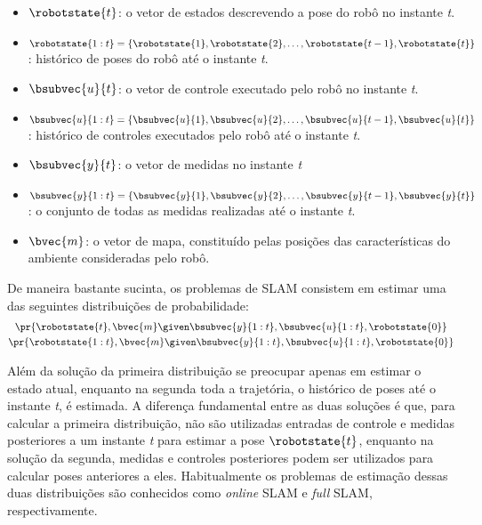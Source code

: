 \begin{itemize}
  \item $\robotstate{t}$: o vetor de estados descrevendo a pose do robô no instante \emph{t}.
  \item $\robotstate{1:t} = \{ \robotstate{1}, \robotstate{2}, \dots, 
  \robotstate{t-1}, \robotstate{t} \}$: histórico de poses do robô até o instante \emph{t}.
  \item $\bsubvec{u}{t}$: o vetor de controle executado pelo robô no instante \emph{t}.
  \item $\bsubvec{u}{1:t} = \{ \bsubvec{u}{1}, \bsubvec{u}{2}, \dots, 
  \bsubvec{u}{t-1}, \bsubvec{u}{t} \}$: histórico de controles executados pelo robô até o instante \emph{t}.
  \item $\bsubvec{y}{t}$: o vetor de medidas no instante \emph{t}
  \item $\bsubvec{y}{1:t} = \{ \bsubvec{y}{1}, \bsubvec{y}{2}, \dots, 
  \bsubvec{y}{t-1}, \bsubvec{y}{t} \}$: o conjunto de todas as medidas realizadas até o instante \emph{t}.
  \item $\bvec{m}$: o vetor de mapa, constituído pelas posições das características do ambiente consideradas pelo robô.
\end{itemize}

De maneira bastante sucinta, os problemas de SLAM consistem em estimar uma das 
seguintes distribuições de probabilidade:
\begin{gather}
  \pr{\robotstate{t}, \bvec{m} \given \bsubvec{y}{1:t} , \bsubvec{u}{1:t}, 
    \robotstate{0}}
  \label{eq:online-slam-probability} \\
  \pr{\robotstate{1:t}, \bvec{m} \given \bsubvec{y}{1:t} , \bsubvec{u}{1:t}, 
    \robotstate{0}}
  \label{eq:full-slam-probability}
\end{gather}

Além da solução da primeira distribuição se preocupar apenas em estimar o 
estado atual, enquanto na segunda toda a trajetória, o histórico de 
poses até o instante \emph{t}, é estimada. A diferença fundamental entre as 
duas soluções é que, para calcular a primeira distribuição, não são utilizadas entradas de controle e medidas posteriores a um instante 
\emph{t} para estimar a pose $\robotstate{t}$, enquanto na 
solução da segunda, medidas e controles posteriores podem ser utilizados para 
calcular poses anteriores a eles. Habitualmente os problemas de estimação 
dessas duas distribuições são conhecidos como \textit{online} SLAM e 
\textit{full} SLAM, respectivamente. 

